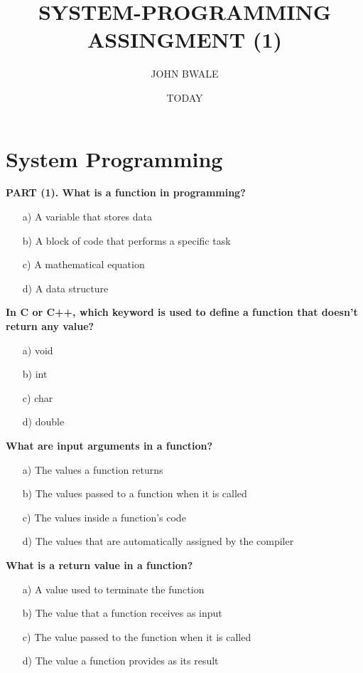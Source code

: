 \documentclass{article}
\begin{document}
\author{JOHN BWALE}
\title{SYSTEM-PROGRAMMING ASSINGMENT (1)}
\date{TODAY}
\maketitle

\section*{System Programming}

\textbf{PART (1). What is a function in programming?}
\begin{enumerate}
  \item[a)] A variable that stores data
  \item[b)] A block of code that performs a specific task
  \item[c)] A mathematical equation
  \item[d)] A data structure
\end{enumerate}

\textbf{In C or C++, which keyword is used to define a function that doesn't return any value?}
\begin{enumerate}
  \item[a)] void
  \item[b)] int
  \item[c)] char
  \item[d)] double
\end{enumerate}

\textbf{What are input arguments in a function?}
\begin{enumerate}
  \item[a)] The values a function returns
  \item[b)] The values passed to a function when it is called
  \item[c)] The values inside a function's code
  \item[d)] The values that are automatically assigned by the compiler
\end{enumerate}

\textbf{What is a return value in a function?}
\begin{enumerate}
  \item[a)] A value used to terminate the function
  \item[b)] The value that a function receives as input
  \item[c)] The value passed to the function when it is called
  \item[d)] The value a function provides as its result
\end{enumerate}
\end{document}
